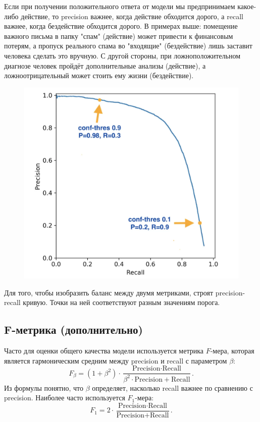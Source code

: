 Если при получении положительного ответа от модели мы предпринимаем какое-либо действие, то precision важнее, когда действие обходится дорого, а recall важнее, когда бездействие обходится дорого. В примерах выше: помещение важного письма в папку "спам" (действие) может привести к финансовым потерям, а пропуск реального спама во "входящие" (бездействие) лишь заставит человека сделать это вручную. С другой стороны, при ложноположительном диагнозе человек пройдёт дополнительные анализы (действие), а ложноотрицательный может стоить ему жизни (бездействие).

\begin{figure}[ht!]
	\centering
	\includegraphics[width=0.65\linewidth]{chapters/model_selection/images/Precisionrecallcurve.png}
\end{figure}

\bigskip
\bigskip

Для того, чтобы изобразить баланс между двумя метриками, строят precision-recall кривую. Точки на ней соответствуют разным значениям порога.

\subsection*{F-метрика (дополнительно)}

Часто для оценки общего качества модели используется метрика $F$-мера, которая является гармоническим средним между precision и recall с параметром $\beta$:
\[
F_{\beta} = (1 + \beta^2) \cdot \frac{\text{Precision} \cdot \text{Recall}}{\beta^2 \cdot \text{Precision} + \text{Recall}}.
\]
Из формулы понятно, что $\beta$ определяет, насколько recall важнее по сравнению с precision. Наиболее часто используется $F_1$-мера:
\[
F_1 = 2 \cdot \frac{\text{Precision} \cdot \text{Recall}}{\text{Precision} + \text{Recall}}.
\]

